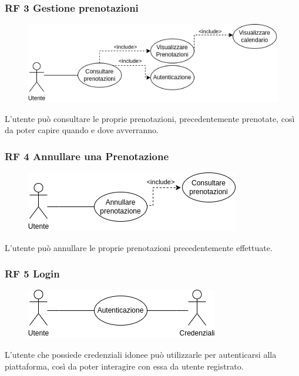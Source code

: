 \documentclass{article}
\begin{document}
\subsubsection{RF 3 Gestione prenotazioni}\label{rf_3}
\begin{description}
	
	\begin{figure}[htp]
		\centering
		\includegraphics[width=\textwidth]{rf3.png}
	\end{figure}
	
	\item L'utente può consultare le proprie prenotazioni, precedentemente prenotate, così da poter capire quando e dove avverranno.
\end{description}

\subsubsection{RF 4 Annullare una Prenotazione}\label{rf_4}
\begin{description}
	
	\begin{figure}[htp]
		\centering
		\includegraphics[]{rf4.png}
	\end{figure}
	
	\item L'utente può annullare le proprie prenotazioni precedentemente effettuate.
\end{description}


\subsubsection{RF 5 Login}\label{rf_5}
\begin{description}
	
	\begin{figure}[htp]
		\centering
		\includegraphics[]{rf5.png}
	\end{figure}
	
	\item L'utente che possiede credenziali idonee può utilizzarle per autenticarsi alla piattaforma, così da poter interagire con essa da utente registrato.
\end{description}
\end{document}
